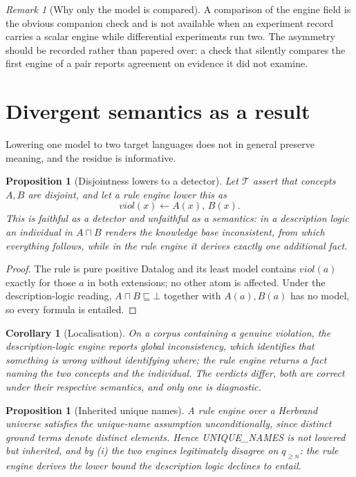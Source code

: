 \documentclass[11pt,a4paper]{article}
\theoremstyle{plain}
\newtheorem{proposition}[theorem]{Proposition}
\newtheorem{corollary}[theorem]{Corollary}
\theoremstyle{definition}
\theoremstyle{remark}
\newtheorem{remark}[theorem]{Remark}
\newcommand{\qq}{q}
\begin{document}
\begin{remark}[Why only the model is compared]
\label{rem:only-model}
A comparison of the engine field is the obvious companion check and is not
available when an experiment record carries a scalar engine while differential
experiments run two. The asymmetry should be recorded rather than papered
over: a check that silently compares the first engine of a pair reports
agreement on evidence it did not examine.
\end{remark}

\section{Divergent semantics as a result}
\label{sec:semantics}

Lowering one model to two target languages does not in general preserve
meaning, and the residue is informative.

\begin{proposition}[Disjointness lowers to a detector]
\label{prop:disjoint-detector}
Let $\mathcal{T}$ assert that concepts $A,B$ are disjoint, and let a rule
engine lower this as
\[
\mathit{viol}(x) \leftarrow A(x),\, B(x).
\]
This is faithful as a \emph{detector} and unfaithful as a \emph{semantics}: in
a description logic an individual in $A \sqcap B$ renders the knowledge base
inconsistent, from which everything follows, while in the rule engine it
derives exactly one additional fact.
\end{proposition}

\begin{proof}
The rule is pure positive Datalog and its least model contains
$\mathit{viol}(a)$ exactly for those $a$ in both extensions; no other atom is
affected. Under the description-logic reading, $A \sqcap B \sqsubseteq \bot$
together with $A(a), B(a)$ has no model, so every formula is entailed.
\end{proof}

\begin{corollary}[Localisation]
\label{cor:localisation}
On a corpus containing a genuine violation, the description-logic engine
reports global inconsistency, which identifies that something is wrong without
identifying where; the rule engine returns a fact naming the two concepts and
the individual. The verdicts differ, both are correct under their respective
semantics, and only one is diagnostic.
\end{corollary}

\begin{proposition}[Inherited unique names]
\label{prop:inherited-una}
A rule engine over a Herbrand universe satisfies the unique-name assumption
unconditionally, since distinct ground terms denote distinct elements. Hence
\textsf{UNIQUE\_NAMES} is not lowered but inherited, and by
(i) the two engines legitimately disagree on
$\qq_{\geq n}$: the rule engine derives the lower bound the description logic
declines to entail.
\end{proposition}
\end{document}
